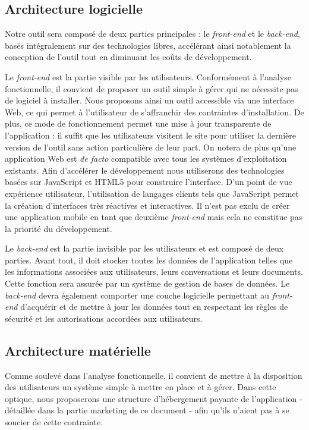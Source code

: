 \documentclass[10pt,twocolumn,a4paper,utf8x]{article}
\begin{document}
\subsection{Architecture logicielle}

Notre outil sera composé de deux parties principales : le
\emph{front-end} et le \emph{back-end}, basés intégralement sur des
technologies libres, accélérant ainsi notablement la conception de
l'outil tout en diminuant les coûts de développement.

Le \emph{front-end} est la partie visible par les utilisateurs.
Conformément à l'analyse fonctionnelle, il convient de proposer un outil
simple à gérer qui ne nécessite pas de logiciel à installer. Nous
proposons ainsi un outil accessible via une interface Web, ce qui permet
à l'utilisateur de s'affranchir des contraintes d'installation. De plus,
ce mode de fonctionnement permet une mise à jour transparente de
l'application : il suffit que les utilisateurs visitent le site pour
utiliser la dernière version de l'outil sans action particulière de leur
part. On notera de plus qu'une application Web est \emph{de facto}
compatible avec tous les systèmes d'exploitation existants. Afin
d'accélérer le développement nous utiliserons des technologies basées
sur JavaScript et HTML5 pour construire l'interface. D'un point de vue
expérience utilisateur, l'utilisation de langages clients tels que
JavaScript permet la création d'interfaces très réactives et
interactives. Il n'est pas exclu de créer une application mobile en tant
que deuxième \emph{front-end} mais cela ne constitue pas la priorité du
développement.

Le \emph{back-end} est la partie invisible par les utilisateurs et est
composé de deux parties. Avant tout, il doit stocker toutes les données
de l'application telles que les informations associées aux utilisateurs,
leurs conversations et leurs documents. Cette fonction sera assurée par
un système de gestion de bases de données. Le \emph{back-end} devra
également comporter une couche logicielle permettant au \emph{front-end}
d'acquérir et de mettre à jour les données tout en respectant les règles
de sécurité et les autorisations accordées aux utilisateurs.

\subsection{Architecture matérielle}

Comme soulevé dans l'analyse fonctionnelle, il convient de mettre à la
disposition des utilisateurs un système simple à mettre en place et à
gérer. Dans cette optique, nous proposerons une structure d'hébergement
payante de l'application - détaillée dans la partie marketing de ce
document - afin qu'ils n'aient pas à se soucier de cette contrainte.
\end{document}

